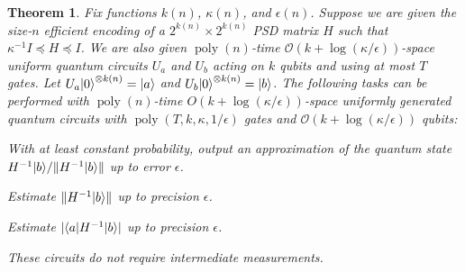 \documentclass[11pt]{article}
\newtheorem{theorem}{Theorem}
\theoremstyle{definition}
\theoremstyle{remark}
\newcommand\bigoh{\mathcal{O}}
\DeclareMathOperator{\poly}{poly}
\begin{document}
\begingroup
\def\thetheorem{\ref{thm: matrix inversion alg}}
\begin{theorem}
Fix functions $k(n)$, $\kappa(n)$, and $\epsilon(n)$. Suppose we are given the size-$n$ efficient encoding of a $2^{k(n)} \times 2^{k(n)}$ PSD matrix $H$ such that $\kappa^{-1} I \preceq H \preceq I$. We are also given $\poly(n)$-time $\mathcal{O}(k+\log(\kappa/\epsilon))$-space uniform quantum circuits $U_a$ and $U_b$ acting on $k$ qubits and using at most $T$ gates. Let $U_a{\left\vert{0}\right\rangle}^{\otimes k(n)} = {\left\vert{a}\right\rangle}$ and $U_b{\left\vert{0}\right\rangle}^{\otimes k(n)} = {\left\vert{b}\right\rangle}$. The following tasks can be performed with $\poly(n)$-time $O(k+\log(\kappa/\epsilon))$-space uniformly generated quantum circuits with $\poly(T,k,\kappa,1/\epsilon)$ gates and $\bigoh (k+\log(\kappa/\epsilon))$ qubits:
\begin{compactenum}
\item With at least constant probability, output an approximation of the quantum state $H^{-1}{\left\vert{b}\right\rangle} / \|H^{-1}{\left\vert{b}\right\rangle}\|$ up to error $\epsilon$.
\item Estimate $\|H^{-1}{\left\vert{b}\right\rangle}\|$ up to precision $\epsilon$.
\item Estimate  $|{\left\langle{a}\right\vert}H^{-1}{\left\vert{b}\right\rangle}|$ up to precision $\epsilon$.
\end{compactenum}
These circuits do not require intermediate measurements.
\end{theorem}
\addtocounter{theorem}{-1}
\endgroup
\end{document}
